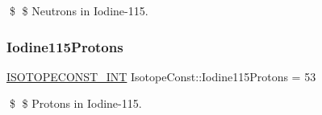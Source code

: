 \$ \$ Neutrons in Iodine-\/115. \mbox{\label{group___isotope_const-_iodine-_i115_gafd4dace4413850ae1b56c5b1f5c0ca50}} 
\subsubsection{\texorpdfstring{Iodine115\+Protons}{Iodine115Protons}}
{\footnotesize\ttfamily \mbox{\hyperlink{group___isotope_const-_macros_ga5f18360b3e99483a35c32d789e62621c}{I\+S\+O\+T\+O\+P\+E\+C\+O\+N\+S\+T\+\_\+\+I\+NT}} Isotope\+Const\+::\+Iodine115\+Protons = 53}

\$ \$ Protons in Iodine-\/115. 